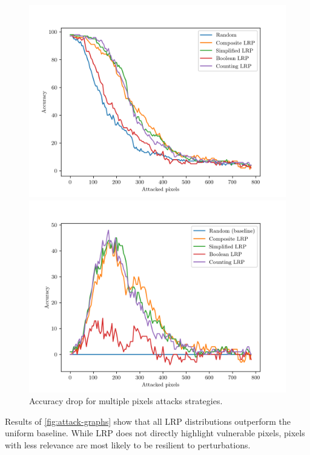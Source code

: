 \documentclass{../cs-classes/cs-classes}
\newcommand*{\1}{\digitsbb{1}}
\newcommand*{\0}{\digitsbb{0}}
\begin{document}
\begin{figure}[H]
    \centering
    \begin{minipage}[c]{.49\textwidth}
        \centering
        \includegraphics[width=\textwidth]{attack-graph-1.png}
    \end{minipage}
    \begin{minipage}[c]{.49\textwidth}
        \centering
        \includegraphics[width=\textwidth]{attack-graph-2.png}
    \end{minipage}
    \caption{Accuracy drop for multiple pixels attacks strategies.}
    \label{fig:attack-graphs}
\end{figure}
Results of \autoref{fig:attack-graphs} show that all LRP distributions outperform the uniform baseline. While LRP does not directly highlight vulnerable pixels, pixels with less relevance are most likely to be resilient to perturbations.
\end{document}
